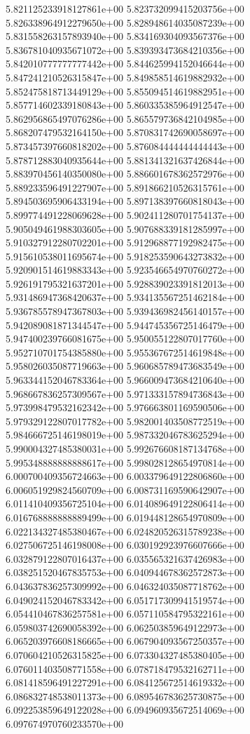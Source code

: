 5.821125233918127861e+00	5.823732099415203756e+00	5.826338964912279650e+00	5.828948614035087239e+00	5.831558263157893940e+00	5.834169304093567376e+00	5.836781040935671072e+00	5.839393473684210356e+00	5.842010777777777442e+00	5.844625994152046644e+00	5.847241210526315847e+00	5.849858514619882932e+00	5.852475818713449129e+00	5.855094514619882951e+00	5.857714602339180843e+00	5.860335385964912547e+00	5.862956865497076286e+00	5.865579736842104985e+00	5.868207479532164150e+00	5.870831742690058697e+00	5.873457397660818202e+00	5.876084444444444443e+00	5.878712883040935644e+00	5.881341321637426844e+00	5.883970456140350080e+00	5.886601678362572976e+00	5.889233596491227907e+00	5.891866210526315761e+00	5.894503695906433194e+00	5.897138397660818043e+00	5.899774491228069628e+00	5.902411280701754137e+00	5.905049461988303605e+00	5.907688339181285997e+00	5.910327912280702201e+00	5.912968877192982475e+00	5.915610538011695674e+00	5.918253590643273832e+00	5.920901514619883343e+00	5.923546654970760272e+00	5.926191795321637201e+00	5.928839023391812013e+00	5.931486947368420637e+00	5.934135567251462184e+00	5.936785578947367803e+00	5.939436982456140157e+00	5.942089081871344547e+00	5.944745356725146479e+00	5.947400239766081675e+00	5.950055122807017760e+00	5.952710701754385880e+00	5.955367672514619848e+00	5.958026035087719663e+00	5.960685789473683549e+00	5.963344152046783364e+00	5.966009473684210640e+00	5.968667836257309567e+00	5.971333157894736843e+00	5.973998479532162342e+00	5.976663801169590506e+00	5.979329122807017782e+00	5.982001403508772519e+00	5.984666725146198019e+00	5.987332046783625294e+00	5.990004327485380031e+00	5.992676608187134768e+00	5.995348888888888617e+00	5.998028128654970814e+00	6.000700409356724663e+00	6.003379649122806860e+00	6.006051929824560709e+00	6.008731169590642907e+00	6.011410409356725104e+00	6.014089649122806414e+00	6.016768888888889499e+00	6.019448128654970809e+00	6.022134327485380467e+00	6.024820526315789238e+00	6.027506725146198008e+00	6.030192923976607666e+00	6.032879122807016437e+00	6.035565321637426983e+00	6.038251520467835753e+00	6.040944678362572873e+00	6.043637836257309992e+00	6.046324035087718762e+00	6.049024152046783342e+00	6.051717309941519574e+00	6.054410467836257581e+00	6.057110584795322161e+00	6.059803742690058392e+00	6.062503859649122973e+00	6.065203976608186665e+00	6.067904093567250357e+00	6.070604210526315825e+00	6.073304327485380405e+00	6.076011403508771558e+00	6.078718479532162711e+00	6.081418596491227291e+00	6.084125672514619332e+00	6.086832748538011373e+00	6.089546783625730875e+00	6.092253859649122028e+00	6.094960935672514069e+00	6.097674970760233570e+00
